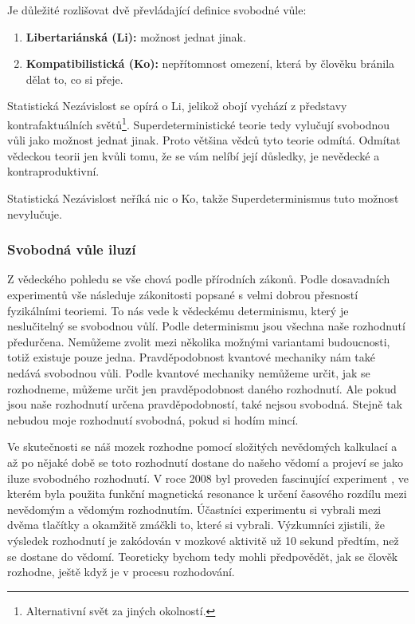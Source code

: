 Je důležité rozlišovat dvě převládající definice svobodné vůle:
\begin{enumerate}
    \item \textbf{Libertariánská (Li):} možnost jednat jinak.
    \item \textbf{Kompatibilistická (Ko):} nepřítomnost omezení, která by člověku bránila dělat to, co si přeje.
\end{enumerate}

Statistická Nezávislost se opírá o Li, jelikož obojí vychází z představy kontrafaktuálních světů\footnote[13]{Alternativní svět za jiných okolností.}. Superdeterministické teorie tedy vylučují svobodnou vůli jako možnost jednat jinak. Proto většina vědců tyto teorie odmítá. Odmítat vědeckou teorii jen kvůli tomu, že se vám nelíbí její důsledky, je nevědecké a kontraproduktivní.

Statistická Nezávislost neříká nic o Ko, takže Superdeterminismus tuto možnost nevylučuje.

\subsubsection{Svobodná vůle iluzí}
Z vědeckého pohledu se vše chová podle přírodních zákonů. Podle dosavadních experimentů vše následuje zákonitosti popsané s velmi dobrou přesností fyzikálními teoriemi. To nás vede k vědeckému determinismu, který je neslučitelný se svobodnou vůlí. Podle determinismu jsou všechna naše rozhodnutí předurčena. Nemůžeme zvolit mezi několika možnými variantami budoucnosti, totiž existuje pouze jedna. Pravděpodobnost kvantové mechaniky nám také nedává svobodnou vůli. Podle kvantové mechaniky nemůžeme určit, jak se rozhodneme, můžeme určit jen pravděpodobnost daného rozhodnutí. Ale pokud jsou naše rozhodnutí určena pravděpodobností, také nejsou svobodná. Stejně tak nebudou moje rozhodnutí svobodná, pokud si hodím mincí.

Ve skutečnosti se náš mozek rozhodne pomocí složitých nevědomých kalkulací a až po nějaké době se toto rozhodnutí dostane do našeho vědomí a projeví se jako iluze svobodného rozhodnutí. V roce 2008 byl proveden fascinující experiment \parencite{DecisionDet}, ve kterém byla použita funkční magnetická resonance k určení časového rozdílu mezi nevědomým a vědomým rozhodnutím. Účastníci experimentu si vybrali mezi dvěma tlačítky a okamžitě zmáčkli to, které si vybrali. Výzkumníci zjistili, že výsledek rozhodnutí je zakódován v mozkové aktivitě už 10 sekund předtím, než se dostane do vědomí. Teoreticky bychom tedy mohli předpovědět, jak se člověk rozhodne, ještě když je v procesu rozhodování.

